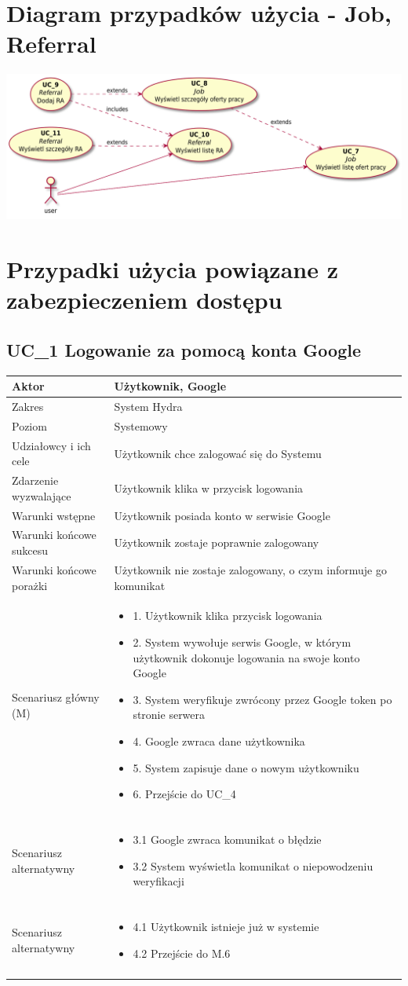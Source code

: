 \documentclass[oneside]{scrreprt}
\newcommand\addheading[2]{#1 &#2\\ \hline}
\newcommand\tabularhead{\begin{center} \begin{tabular}{lp{8cm}}
		\hline
	}
\newcommand\addmulrow[2]{ \begin{minipage}[t][][t]{6cm}#1\end{minipage}%
		&\begin{minipage}[t][][t]{8cm}
			\begin{itemize} #2 \newline \end{itemize}
		\end{minipage}\\ \\  \hline}
\newenvironment{usecase}{\tabularhead}
	{\hline\end{tabular} \end{center}}
\begin{document}
\section{Diagram przypadków użycia - Job, Referral}
\includegraphics[width=\textwidth, keepaspectratio]{graphics/job_referral_use_case_diagram.pdf}

\section{Przypadki użycia powiązane z zabezpieczeniem dostępu}
\subsection{UC\_1 Logowanie za pomocą konta Google}

\begin{usecase}
	\addheading{Aktor}{Użytkownik, Google} 
	\addheading{Zakres}{System Hydra}
	\addheading{Poziom}{Systemowy}
	\addheading{Udziałowcy i ich cele}{Użytkownik chce zalogować się do Systemu}
	\addheading{Zdarzenie wyzwalające}{Użytkownik klika w przycisk logowania}
	\addheading{Warunki wstępne}{Użytkownik posiada konto w serwisie Google}
	\addheading{Warunki końcowe sukcesu}{Użytkownik zostaje poprawnie zalogowany}
	\addheading{Warunki końcowe porażki}{Użytkownik nie zostaje zalogowany, o czym informuje go komunikat}
	\addmulrow{Scenariusz główny (M)}{
		\item[] 1. Użytkownik klika przycisk logowania
		\item[] 2. System wywołuje serwis Google, w którym użytkownik dokonuje logowania na swoje konto Google
		\item[] 3. System weryfikuje zwrócony przez Google token po stronie serwera
		\item[] 4. Google zwraca dane użytkownika
		\item[] 5. System zapisuje dane o nowym użytkowniku
		\item[] 6. Przejście do UC\_4
	}
	\addmulrow{Scenariusz alternatywny}{
		\item[] 3.1 Google zwraca komunikat o błędzie
		\item[] 3.2 System wyświetla komunikat o niepowodzeniu weryfikacji
	}
	\addmulrow{Scenariusz alternatywny}{
		\item[] 4.1 Użytkownik istnieje już w systemie
		\item[] 4.2 Przejście do M.6
	}
\end{usecase}
\end{document}
